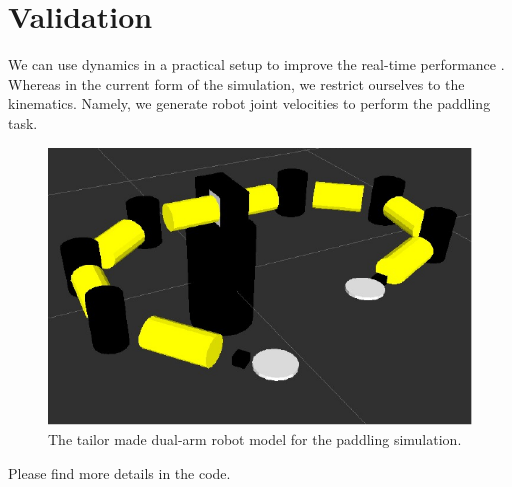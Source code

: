 \documentclass[letterpaper, 10 pt, conference]{ieeeconf}  %
\begin{document}
\section{Validation}
\label{sec:experiment}
We can use dynamics in a practical setup to improve the real-time performance \cite{nakashima2006paddle}. Whereas in the current form of the simulation, we restrict ourselves to the kinematics. Namely, we generate robot joint velocities to perform the paddling task.  

\begin{figure}[htbp]
  \begin{center}
    \includegraphics[width=1.0\columnwidth]{fig/robotModel-crop}
    \caption{
      The tailor made dual-arm robot model for the paddling simulation.
    }
     \label{fig:trajectory}
  \end{center}
\end{figure}


Please find more details in the code. 



\end{document}
